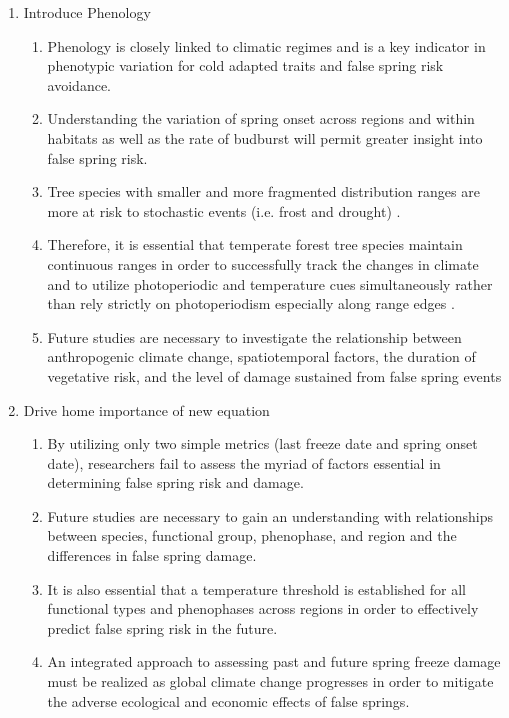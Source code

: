 \documentclass{article}\usepackage[]{graphicx}\usepackage[]{color}
\begin{document}
\begin{enumerate}
\item Introduce Phenology
\begin{enumerate}
\item Phenology is closely linked to climatic regimes \citep{Wolkovich2011} and is a key indicator in phenotypic variation for cold adapted traits and false spring risk avoidance.
\item Understanding the variation of spring onset across regions and within habitats as well as the rate of budburst will permit greater insight into false spring risk.
\item Tree species with smaller and more fragmented distribution ranges are more at risk to stochastic events (i.e. frost and drought) \citep{Alberto2013}. 
\item Therefore, it is essential that temperate forest tree species maintain continuous ranges in order to successfully track the changes in climate and to utilize photoperiodic and temperature cues simultaneously rather than rely strictly on photoperiodism especially along range edges \citep{Zohner2016, Gauzere2017}.
\item Future studies are necessary to investigate the relationship between anthropogenic climate change, spatiotemporal factors, the duration of vegetative risk, and the level of damage sustained from false spring events
\end{enumerate}

\item Drive home importance of new equation
\begin{enumerate}
\item By utilizing only two simple metrics (last freeze date and spring onset date), researchers fail to assess the myriad of factors essential in determining false spring risk and damage. 
\item Future studies are necessary to gain an understanding with relationships between species, functional group, phenophase, and region and the differences in false spring damage. 
\item It is also essential that a temperature threshold is established for all functional types and phenophases across regions in order to effectively predict false spring risk in the future.
\item An integrated approach to assessing past and future spring freeze damage must be realized as global climate change progresses in order to mitigate the adverse ecological and economic effects of false springs.
\end{enumerate}
\end{enumerate}
\end{document}
